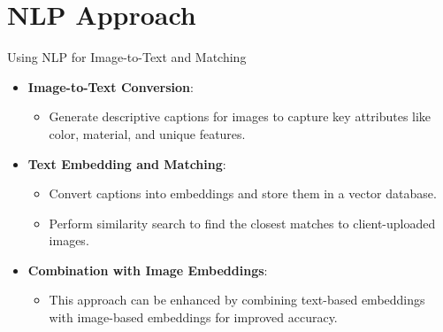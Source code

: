 \documentclass{beamer}
\begin{document}
\section{NLP Approach}
    \begin{frame}{Using NLP for Image-to-Text and Matching}
    \begin{itemize}
        \item \textbf{Image-to-Text Conversion}:
        \begin{itemize}
            \item Generate descriptive captions for images to capture key attributes like color, material, and unique features.
        \end{itemize}
        \item \textbf{Text Embedding and Matching}:
        \begin{itemize}
            \item Convert captions into embeddings and store them in a vector database.
            \item Perform similarity search to find the closest matches to client-uploaded images.
        \end{itemize}
        \item \textbf{Combination with Image Embeddings}:
        \begin{itemize}
            \item This approach can be enhanced by combining text-based embeddings with image-based embeddings for improved accuracy.
        \end{itemize}
    \end{itemize}
\end{frame}
\end{document}
